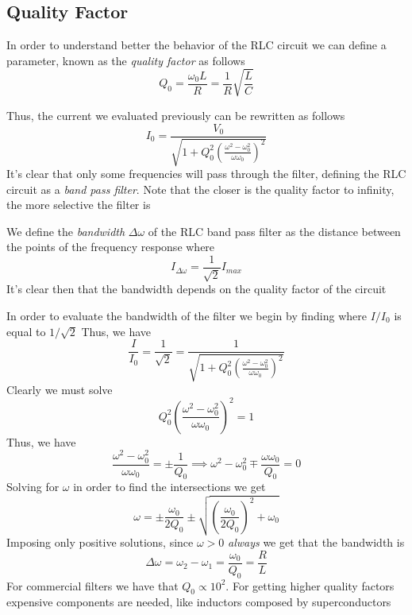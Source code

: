 \documentclass[../electromagnetism.tex]{subfiles}
\begin{document}
\subsection{Quality Factor}
\begin{dfn}
In order to understand better the behavior of the RLC circuit we can define a parameter, known as the \textit{quality factor} as follows
\begin{equation}
	Q_0=\frac{\omega_0 L}{R}=\frac{1}{R}\sqrt{\frac{L}{C}}
	\label{eq:qualityfactor.rlc}
\end{equation}
\end{dfn}
Thus, the current we evaluated previously can be rewritten as follows
\begin{equation}
	I_0=\frac{V_0}{\sqrt{1+Q_0^2\left( \frac{\omega^2-\omega_0^2}{\omega\omega_0} \right)^2}}
	\label{eq:i0quality.rlc}
\end{equation}
It's clear that only some frequencies will pass through the filter, defining the RLC circuit as a \textit{band pass filter}. Note that the closer is the quality factor to infinity, the more selective the filter is\\
\begin{dfn}[Bandwidth]
	We define the \textit{bandwidth} $\Delta\omega$ of the RLC band pass filter as the distance between the points of the frequency response where
	\begin{equation}
		I_{\Delta\omega}=\frac{1}{\sqrt{2}}I_{max}
		\label{eq:bandwidthcond.rlc}
	\end{equation}
	It's clear then that the bandwidth depends on the quality factor of the circuit
\end{dfn}
In order to evaluate the bandwidth of the filter we begin by finding where $I/I_0$ is equal to $1/\sqrt{2}$ Thus, we have
\begin{equation*}
	\frac{I}{I_0}=\frac{1}{\sqrt{2}}=\frac{1}{\sqrt{1+Q_0^2\left( \frac{\omega^2-\omega_0^2}{\omega\omega_0} \right)^2}}
\end{equation*}
Clearly we must solve 
\begin{equation*}
	Q_0^2\left( \frac{\omega^2-\omega_0^2}{\omega\omega_0} \right)^2=1
\end{equation*}
Thus, we have
\begin{equation*}
	\frac{\omega^2-\omega_0^2}{\omega\omega_0}=\pm\frac{1}{Q_0}\implies\omega^2-\omega_0^2\mp\frac{\omega\omega_0}{Q_0}=0
\end{equation*}
Solving for $\omega$ in order to find the intersections we get
\begin{equation}
	\omega=\pm\frac{\omega_0}{2Q_0}\pm\sqrt{\left( \frac{\omega_0}{2Q_0} \right)^2+\omega_0}
	\label{eq:freqsolbandwidth.rlc}
\end{equation}
Imposing only positive solutions, since $\omega>0$ \textit{always} we get that the bandwidth is 
\begin{equation}
	\Delta\omega=\omega_2-\omega_1=\frac{\omega_0}{Q_0}=\frac{R}{L}
	\label{eq:bandwidth.rlc}
\end{equation}
For commercial filters we have that $Q_0\propto10^2$. For getting higher quality factors expensive components are needed, like inductors composed by superconductors
\end{document}
